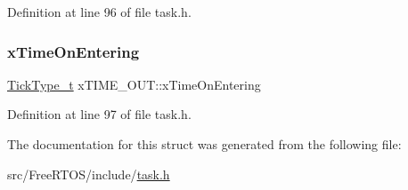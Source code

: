 Definition at line 96 of file task.\+h.

\mbox{\label{structx_t_i_m_e___o_u_t_a3464939ca050f7bcc6ffe0d8d3766337}} 
\subsubsection{\texorpdfstring{x\+Time\+On\+Entering}{xTimeOnEntering}}
{\footnotesize\ttfamily \hyperlink{portmacro_8h_aa69c48c6e902ce54f70886e6573c92a9}{Tick\+Type\+\_\+t} x\+T\+I\+M\+E\+\_\+\+O\+U\+T\+::x\+Time\+On\+Entering}



Definition at line 97 of file task.\+h.



The documentation for this struct was generated from the following file\+:\begin{DoxyCompactItemize}
\item 
src/\+Free\+R\+T\+O\+S/include/\hyperlink{task_8h}{task.\+h}\end{DoxyCompactItemize}
